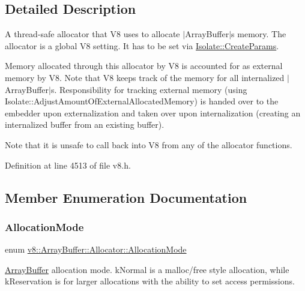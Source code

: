 \subsection{Detailed Description}
A thread-\/safe allocator that V8 uses to allocate $\vert$\+Array\+Buffer$\vert$\textquotesingle{}s memory. The allocator is a global V8 setting. It has to be set via \mbox{\hyperlink{structv8_1_1Isolate_1_1CreateParams}{Isolate\+::\+Create\+Params}}.

Memory allocated through this allocator by V8 is accounted for as external memory by V8. Note that V8 keeps track of the memory for all internalized $\vert$\+Array\+Buffer$\vert$s. Responsibility for tracking external memory (using Isolate\+::\+Adjust\+Amount\+Of\+External\+Allocated\+Memory) is handed over to the embedder upon externalization and taken over upon internalization (creating an internalized buffer from an existing buffer).

Note that it is unsafe to call back into V8 from any of the allocator functions. 

Definition at line 4513 of file v8.\+h.



\subsection{Member Enumeration Documentation}
\mbox{\label{classv8_1_1ArrayBuffer_1_1Allocator_ab106d1fbad7be9f6fd8b0f5c550ac59e}} 
\subsubsection{\texorpdfstring{Allocation\+Mode}{AllocationMode}}
{\footnotesize\ttfamily enum \mbox{\hyperlink{classv8_1_1ArrayBuffer_1_1Allocator_ab106d1fbad7be9f6fd8b0f5c550ac59e}{v8\+::\+Array\+Buffer\+::\+Allocator\+::\+Allocation\+Mode}}\hspace{0.3cm}{\ttfamily [strong]}}

\mbox{\hyperlink{classv8_1_1ArrayBuffer}{Array\+Buffer}} allocation mode. k\+Normal is a malloc/free style allocation, while k\+Reservation is for larger allocations with the ability to set access permissions. 

